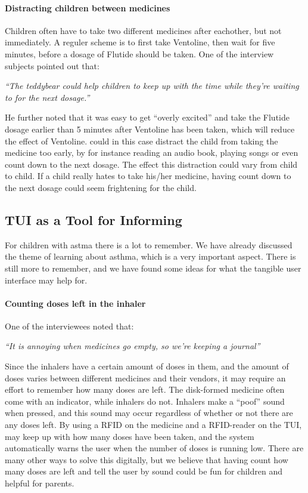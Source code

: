 \paragraph{Distracting children between medicines}

Children often have to take two different medicines after eachother, but not immediately. A reguler scheme is to first take Ventoline, then wait for five minutes, before a dosage of Flutide should be taken. One of the interview subjects pointed out that: 

\textit{``The teddybear could help children to keep up with the time while they're waiting to for the next dosage.''}

He further noted that it was easy to get ``overly excited'' and take the Flutide dosage earlier than 5 minutes after Ventoline has been taken, which will reduce the effect of Ventoline. \ab{} could in this case distract the child from taking the medicine too early, by for instance reading an audio book, playing songs or even count down to the next dosage. The effect this distraction could vary from child to child. If a child really hates to take his/her medicine, having \ab{} count down to the next dosage could seem frightening for the child.   
  

\subsection{TUI as a Tool for Informing}
\label{sec:tuiasatoolforinforming}
For children with astma there is a lot to remember. We have already discussed the theme of learning about asthma, which is a very important aspect. There is still more to remember, and we have found some ideas for what the tangible user interface may help for. 

\paragraph{Counting doses left in the inhaler}
One of the interviewees noted that: 

\textit{``It is annoying when medicines go empty, so we're keeping a journal''}

Since the inhalers have a certain amount of doses in them, and the amount of doses varies between different medicines and their vendors, it may require an effort to remember how many doses are left. The disk-formed medicine often come with an indicator, while inhalers do not. Inhalers make a ``poof'' sound when pressed, and this sound may occur regardless of whether or not there are any doses left. By using a RFID on the medicine and a RFID-reader on the TUI, may keep up with how many doses have been taken, and the system automatically warns the user when the number of doses is running low. There are many other ways to solve this digitally, but we believe that having \buddy{} count how many doses are left and  tell the user by sound could be fun for children and helpful for parents.

